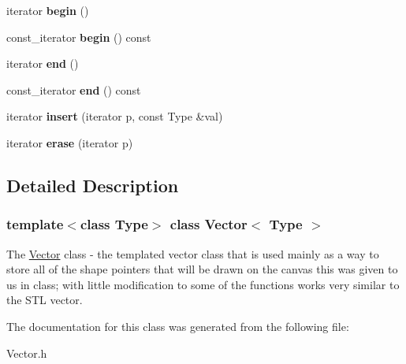 \begin{DoxyCompactItemize}
iterator {\bfseries begin} ()
\item 
\mbox{\label{class_vector_a81f211393ac5acf7ea0a021d81456b60}} 
const\+\_\+iterator {\bfseries begin} () const
\item 
\mbox{\label{class_vector_ab4384e8d78cc67530edcff225becb88b}} 
iterator {\bfseries end} ()
\item 
\mbox{\label{class_vector_a90af5eec59b6d5252dfb6139c43dcead}} 
const\+\_\+iterator {\bfseries end} () const
\item 
\mbox{\label{class_vector_aec5c8c190b418825e31204d26a13b923}} 
iterator {\bfseries insert} (iterator p, const Type \&val)
\item 
\mbox{\label{class_vector_a77c26be8457ea5786f01da40e59c0404}} 
iterator {\bfseries erase} (iterator p)
\end{DoxyCompactItemize}


\subsection{Detailed Description}
\subsubsection*{template$<$class Type$>$\newline
class Vector$<$ Type $>$}

The \hyperlink{class_vector}{Vector} class -\/ the templated vector class that is used mainly as a way to store all of the shape pointers that will be drawn on the canvas this was given to us in class; with little modification to some of the functions works very similar to the S\+TL vector. 

The documentation for this class was generated from the following file\+:\begin{DoxyCompactItemize}
\item 
Vector.\+h\end{DoxyCompactItemize}
